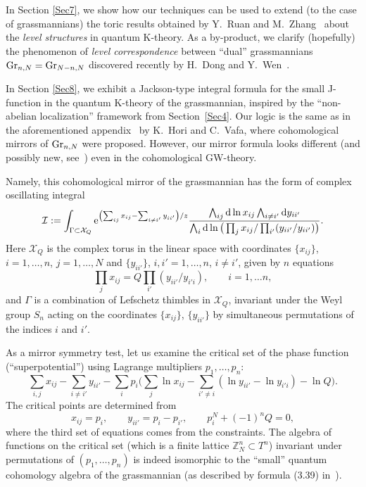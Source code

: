 \documentclass[10pt,a4paper]{amsart}
\numberwithin{equation}{section}
\def\I{\mathcal I}
\def\X{\mathcal X}
\def\ZZ{\mathbb Z}
\theoremstyle{definition}
\theoremstyle{plain}
\begin{document}
In Section \ref{Sec7}, we show how our techniques can be used to extend (to the case of grassmannians) the toric results obtained by Y.~Ruan and M.~Zhang~\cite{R-Z} about the {\em level structures} in quantum \mbox{K-theory}. As a by-product, we clarify (hopefully) the phenomenon of {\em level correspondence} between ``dual'' grassmannians ${\rm Gr}_{n,N}={\rm Gr}_{N-n,N}$ discovered recently by H.~Dong and Y.~Wen~\cite{Dong-Wen}.

In Section \ref{Sec8}, we exhibit a Jackson-type integral formula for the small J-function in the quantum K-theory of the grassmannian, inspired by the ``non-abelian localization'' framework from Section~\ref{Sec4}. Our logic is the same as in the aforementioned appendix~\cite{Hori-Vafa} by K.~Hori and C.~Vafa, where cohomological mirrors of ${\rm Gr}_{n,N}$ were proposed. However, our mirror formula looks different (and possibly new, see~\cite{M-R}) even in the cohomological GW-theory.

Namely, this cohomological mirror of the grassmannian has the form of complex oscillating integral
\[
\I:=\int_{\Gamma\subset \X_{Q}} {\rm e}^{\left(\sum_{ij} x_{ij}-\sum_{i\neq i'}y_{ii'}\right)/z} \frac{\bigwedge_{ij} {\rm d}\ln x_{ij} \bigwedge_{i\neq i'}{\rm d}y_{ii'}}{\bigwedge_i {\rm d}\ln \big(\prod_jx_{ij}/\prod_{i'}(y_{ii'}/y_{ii'})\big)}.
\]
Here $\X_{Q}$ is the complex torus in the linear space with coordinates $\{ x_{ij}\}$, $i=1,\dots,n$, $j=1,\dots, N$ and $\{ y_{ii'}\}$, $i,i'=1,\dots,n$, $i\neq i'$, given by $n$ equations
\[
\prod_j x_{ij}=Q \prod_{i'}(y_{ii'}/y_{i'i}), \qquad i=1,\dots n,
\]
and $\Gamma$ is a combination of Lefschetz thimbles in $\X_{Q}$, invariant under the Weyl group $S_n$ acting on the coordinates $\{ x_{ij} \}$, $\{y_{ii'} \}$ by simultaneous permutations of the indices $i$ and $i'$.

As a mirror symmetry test, let us examine the critical set of the phase function (``superpotential'') using Lagrange multipliers $p_1,\dots, p_n$:
\[
\sum_{i,j}x_{ij}-\sum_{i\neq i'}y_{ii'}-\sum_i p_i\bigg(\sum_j\ln x_{ij} -\sum_{i'\neq i} (\ln y_{ii'}-\ln y_{i'i})-\ln Q\bigg).
\]
The critical points are determined from
\[
x_{ij}=p_i,\qquad y_{ii'}=p_i-p_{i'},\qquad p_i^N+(-1)^nQ=0,
\]
where the third set of equations comes from the constraints. The algebra of functions on the critical set (which is a finite lattice $\ZZ_N^n\subset T^n$) invariant under permutations of $(p_1,\dots,p_n)$
is indeed isomorphic to the ``small'' quantum cohomology algebra of the grassmannian (as described by formula (3.39) in~\cite{Witten}).
\end{document}
